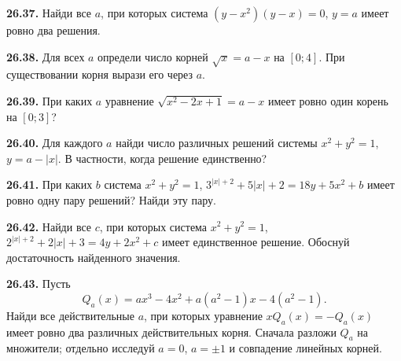 \noindent\begin{minipage}[t]{\linewidth}\textbf{26.37.}\starmark{} Найди все \(a\), при которых система \((y-x^2)(y-x)=0\), \(y=a\) имеет ровно два решения.\par\end{minipage}\par
\noindent\begin{minipage}[t]{\linewidth}\textbf{26.38.} Для всех \(a\) определи число корней \(\sqrt{x}=a-x\) на \([0;4]\). При существовании корня вырази его через \(a\).\par\end{minipage}\par
\noindent\begin{minipage}[t]{\linewidth}\textbf{26.39.}\starmark{} При каких \(a\) уравнение \(\sqrt{x^2-2x+1}=a-x\) имеет ровно один корень на \([0;3]\)?\par\end{minipage}\par
\noindent\begin{minipage}[t]{\linewidth}\textbf{26.40.}\starmark{} Для каждого \(a\) найди число различных решений системы \(x^2+y^2=1\), \(y=a-|x|\). В частности, когда решение единственно?\par\end{minipage}\par
\noindent\begin{minipage}[t]{\linewidth}\textbf{26.41.}\starmark{} При каких \(b\) система \(x^2+y^2=1\), \(3^{|x|+2}+5|x|+2=18y+5x^2+b\) имеет ровно одну пару решений? Найди эту пару.\par\end{minipage}\par
\noindent\begin{minipage}[t]{\linewidth}\textbf{26.42.}\starmark{} Найди все \(c\), при которых система \(x^2+y^2=1\), \(2^{|x|+2}+2|x|+3=4y+2x^2+c\) имеет единственное решение. Обоснуй достаточность найденного значения.\par\end{minipage}\par
\noindent\begin{minipage}[t]{\linewidth}\textbf{26.43.}\starmark{} Пусть
\[
Q_a(x)=ax^3-4x^2+a(a^2-1)x-4(a^2-1).
\]
Найди все действительные \(a\), при которых уравнение \(xQ_a(x)=-Q_a(x)\) имеет ровно два различных действительных корня. Сначала разложи \(Q_a\) на множители; отдельно исследуй \(a=0\), \(a=\pm1\) и совпадение линейных корней.\par\end{minipage}\par
